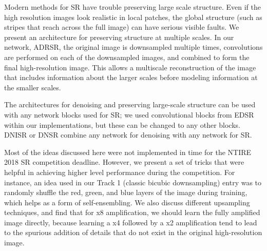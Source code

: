 \documentclass[10pt,twocolumn,letterpaper]{article}
\begin{document}
Modern methods for SR have trouble preserving large scale structure. Even if the high resolution images look realistic in local patches, the global structure (such as stripes that reach across the full image) can have serious visible faults. We present an architecture for preserving structure at multiple scales. In our network, ADRSR, the original image is downsampled multiple times, convolutions are performed on each of the downsampled images, and combined to form the final high-resolution image. This allows a multiscale reconstruction of the image that includes information about the larger scales before modeling information at the smaller scales.


The architectures for denoising and preserving large-scale structure can be used with any network blocks used for SR; we used convolutional blocks from EDSR \cite{EDSR} within our implementations, but these can be changed to any other blocks. DNISR or DNSR combine any network for denoising with any network for SR. 

Most of the ideas discussed here were not implemented in time for the NTIRE 2018 SR competition deadline. However, we present a set of tricks that were helpful in achieving higher level performance during the competition. For instance, an idea used in our Track 1 (classic bicubic downsampling) entry was to randomly shuffle the red, green, and blue layers of the image during training, which helps as a form of self-ensembling. We also discuss different upsampling techniques, and find that for x8 amplification, we should learn the fully amplified image directly, because learning a x4 followed by a x2 amplification tend to lead to the spurious addition of details that do not exist in the original high-resolution image. 
 
\end{document}
